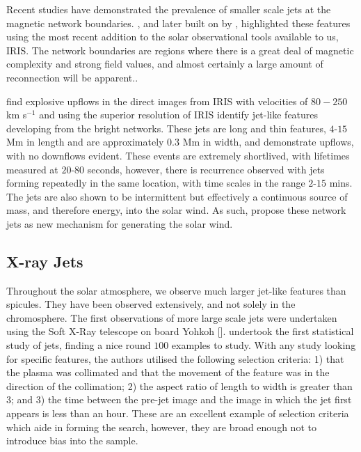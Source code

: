 Recent studies have demonstrated the prevalence of smaller scale jets at the magnetic network boundaries.
\cite{Tian2014}, and later built on by \cite{Narang2016}, highlighted these features using the most recent addition to the solar observational tools available to us, IRIS.
The network boundaries are regions where there is a great deal of magnetic complexity and strong field values, and almost certainly a large amount of reconnection will be apparent.. 

\cite{Narang2016} find explosive upflows in the direct images from IRIS with velocities of $80-250$ km s$^{-1}$ and using the superior resolution of IRIS identify jet-like features developing from the bright networks.
These jets are long and thin features, $4$-$15$ Mm in length and are approximately $0.3$ Mm in width, and demonstrate upflows, with no downflows evident.
These events are extremely shortlived, with lifetimes measured at $20$-$80$ seconds, however, there is recurrence observed with jets forming repeatedly in the same location, with time scales in the range $2$-$15$ mins.
The jets are also shown to be intermittent but effectively a continuous source of mass, and therefore energy, into the solar wind.
As such, \cite{Narang2016} propose these network jets as new mechanism for generating the solar wind.


\subsection{X-ray Jets}
Throughout the solar atmosphere, we observe much larger jet-like features than spicules.
They have been observed extensively, and not solely in the chromosphere.
The first observations of more large scale jets were undertaken using the Soft X-Ray telescope on board Yohkoh [\cite{Tsuneta1991}].
\cite{Shimojo1996} undertook the first statistical study of jets, finding a nice round $100$ examples to study.
With any study looking for specific features, the authors utilised the following selection criteria: 1) that the plasma was collimated and that the movement of the feature was in the direction of the collimation; 2) the aspect ratio of length to width is greater than $3$; and 3) the time between the pre-jet image and the image in which the jet first appears is less than an hour.
These are an excellent example of selection criteria which aide in forming the search, however, they are broad enough not to introduce bias into the sample.

